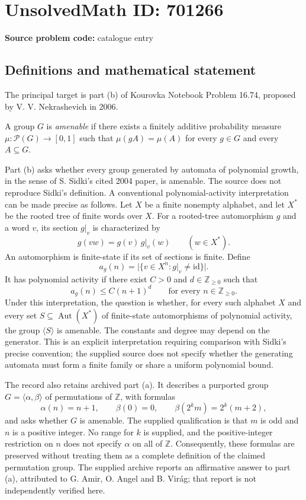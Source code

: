 \documentclass[11pt]{article}
\newcommand{\Z}{\mathbb{Z}}
\begin{document}
\section*{UnsolvedMath ID: 701266}
\textbf{Source problem code:} catalogue entry
\subsection{Definitions and mathematical statement}
The principal target is part (b) of Kourovka Notebook Problem 16.74, proposed by V. V. Nekrashevich in 2006.

A group \(G\) is \emph{amenable} if there exists a finitely additive probability measure \(\mu\colon\mathcal P(G)\to[0,1]\) such that \(\mu(gA)=\mu(A)\) for every \(g\in G\) and every \(A\subseteq G\).

Part (b) asks whether every group generated by automata of polynomial growth, in the sense of S. Sidki's cited 2004 paper, is amenable. The source does not reproduce Sidki's definition. A conventional polynomial-activity interpretation can be made precise as follows. Let \(X\) be a finite nonempty alphabet, and let \(X^*\) be the rooted tree of finite words over \(X\). For a rooted-tree automorphism \(g\) and a word \(v\), its section \(g|_v\) is characterized by
\[
 g(vw)=g(v)\,g|_v(w)\qquad(w\in X^*).
\]
An automorphism is finite-state if its set of sections is finite. Define
\[
 a_g(n)=\bigl|\{v\in X^n:g|_v\ne\mathrm{id}\}\bigr|.
\]
It has polynomial activity if there exist \(C>0\) and \(d\in\Z_{\ge0}\) such that
\[
 a_g(n)\le C(n+1)^d\qquad\text{for every }n\in\Z_{\ge0}.
\]
Under this interpretation, the question is whether, for every such alphabet \(X\) and every set \(S\subseteq\operatorname{Aut}(X^*)\) of finite-state automorphisms of polynomial activity, the group \(\langle S\rangle\) is amenable. The constants and degree may depend on the generator. This is an explicit interpretation requiring comparison with Sidki's precise convention; the supplied source does not specify whether the generating automata must form a finite family or share a uniform polynomial bound.

The record also retains archived part (a). It describes a purported group \(G=\langle\alpha,\beta\rangle\) of permutations of \(\Z\), with formulas
\[
 \alpha(n)=n+1,\qquad \beta(0)=0,\qquad
 \beta(2^k m)=2^k(m+2),
\]
and asks whether \(G\) is amenable. The supplied qualification is that \(m\) is odd and \(n\) is a positive integer. No range for \(k\) is supplied, and the positive-integer restriction on \(n\) does not specify \(\alpha\) on all of \(\Z\). Consequently, these formulas are preserved without treating them as a complete definition of the claimed permutation group. The supplied archive reports an affirmative answer to part (a), attributed to G. Amir, O. Angel and B. Vir\'ag; that report is not independently verified here.
\end{document}
